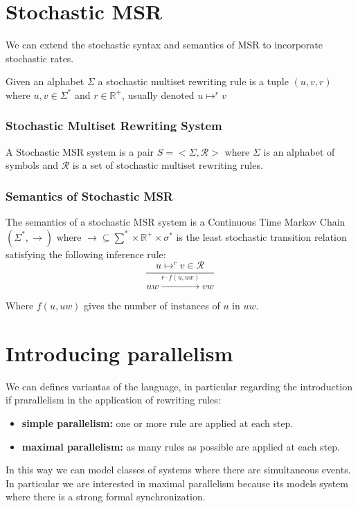\section{Stochastic MSR}
We can extend the stochastic syntax and semantics of MSR to incorporate stochastic rates.\par
Given an alphabet $\Sigma$ a stochastic multiset rewriting rule is a tuple $(u, v, r)$ where $u, v \in \Sigma^{*}$ and $r \in \mathbb{R}^{+}$, usually denoted $u \mapsto^{r} v$

\subsubsection{Stochastic Multiset Rewriting System}
A Stochastic MSR system is a pair $S = <\Sigma, \mathcal{R}>$ where $\Sigma$ is an alphabet of symbols and $\mathcal{R}$ is a set of stochastic multiset rewriting rules.

\subsubsection{Semantics of Stochastic MSR}
The semantics of a stochastic MSR system is a Continuous Time Markov Chain $(\Sigma^{*}, \rightarrow)$ where $\rightarrow \subseteq \sum^{*} \times \mathbb{R}^{+} \times \sigma^{*}$ is the least stochastic transition relation satisfying the following inference rule:
\begin{equation*}
    \frac{ u \mapsto^{r} v \in \mathcal{R}}{uw \xrightarrow{r \cdot f(u, uw)} vw}
\end{equation*}

Where $f(u, uw)$ gives the number of instances of $u$ in $uw$.

\section{Introducing parallelism}
We can defines variantas of the language, in particular regarding the introduction if prarallelism in the application of rewriting rules:
\begin{itemize}
    \item \textbf{simple parallelism:} one or more rule are applied at each step.
    \item \textbf{maximal parallelism:} as many rules as possible are applied at each step.
\end{itemize}
In this way we can model classes of systems where there are simultaneous events. In particular we are interested in maximal parallelism because its models system where there is a strong formal synchronization.

